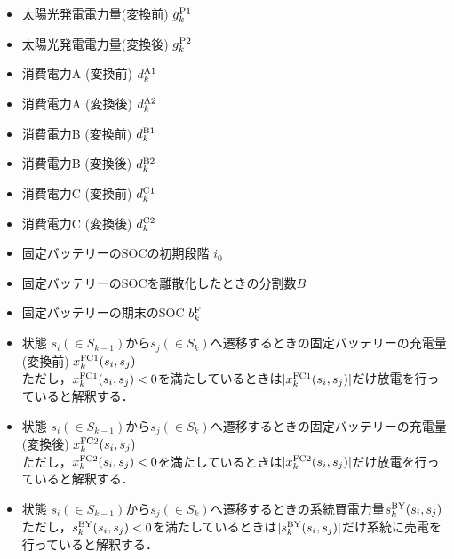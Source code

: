 \documentclass{jarticle}
\newcommand{\IB}{$\bullet$}
\newcommand{\IC}{$\circ$}
\begin{document}
 \begin{itemize}
  \item[\IB] 太陽光発電電力量(変換前) $g^{\rm P1}_{k}$
  \item[\IC] 太陽光発電電力量(変換後) $g^{\rm P2}_{k}$
  \item[\IC] 消費電力A (変換前) $d^{\rm A1}_{k}$
 \item[\IB] 消費電力A (変換後) $d^{\rm A2}_{k}$
  \item[\IC] 消費電力B (変換前) $d^{\rm B1}_{k}$
  \item[\IB] 消費電力B (変換後) $d^{\rm B2}_{k}$
 \item[\IC] 消費電力C (変換前) $d^{\rm C1}_{k}$
  \item[\IB] 消費電力C (変換後) $d^{\rm C2}_{k}$
  \item[\IB] 固定バッテリーのSOCの初期段階 $i_{0}$
  \item[\IB] 固定バッテリーのSOCを離散化したときの分割数$B$
  \item[\IC] 固定バッテリーの期末のSOC $b^{\rm F}_{k}$
  \item[\IC] 状態 $s_{i}(\in S_{k-1})$から$ s_{j} (\in S_{k})$へ遷移するときの固定バッテリーの充電量(変換前) $x^{\rm FC1}_{k}(s_{i},s_{j})$
  \\ただし，$x^{\rm FC1}_{k}(s_{i},s_{j}) < 0$を満たしているときは$|x^{\rm FC1}_{k}(s_{i},s_{j})|$だけ放電を行っていると解釈する．
  \item[\IC] 状態 $s_{i}(\in S_{k-1})$から$ s_{j} (\in S_{k})$へ遷移するときの固定バッテリーの充電量(変換後) $x^{\rm FC2}_{k}(s_{i},s_{j})$
   \\ただし，$x^{\rm FC2}_{k}(s_{i},s_{j}) < 0$を満たしているときは$|x^{\rm FC2}_{k}(s_{i},s_{j})|$だけ放電を行っていると解釈する．

  \item[\IC] 状態 $s_{i}(\in S_{k-1})$から$ s_{j} (\in S_{k})$へ遷移するときの系統買電力量$s^{\rm BY}_{k}(s_{i},s_{j})$  \\ただし，$s^{\rm BY}_{k}(s_{i},s_{j})< 0$を満たしているときは$|s^{\rm BY}_{k}(s_{i},s_{j}) |$だけ系統に売電を行っていると解釈する．
  
\end{itemize}
\end{document}
